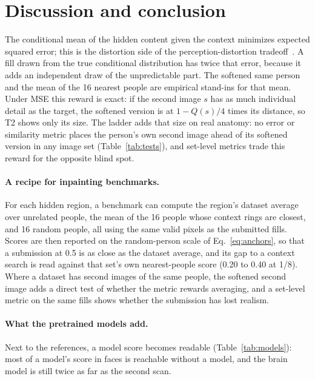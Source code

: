 \section{Discussion and conclusion}
\label{sec:synthesis}
The conditional mean of the hidden content given the context minimizes expected squared error; this is the distortion side of the perception-distortion tradeoff~\cite{blau2018}.
A fill drawn from the true conditional distribution has twice that error, because it adds an independent draw of the unpredictable part.
The softened same person and the mean of the 16 nearest people are empirical stand-ins for that mean.
Under \ac{MSE} this reward is exact: if the second image $s$ has as much individual detail as the target, the softened version is at $1-Q(s)/4$ times its distance, so T2 shows only its size.
The ladder adds that size on real anatomy: no error or similarity metric places the person's own second image ahead of its softened version in any image set (Table~\ref{tab:tests}), and set-level metrics trade this reward for the opposite blind spot.

\paragraph{A recipe for inpainting benchmarks.}
For each hidden region, a benchmark can compute the region's dataset average over unrelated people, the mean of the 16 people whose context rings are closest, and 16 random people, all using the same valid pixels as the submitted fills.
Scores are then reported on the random-person scale of Eq.~\ref{eq:anchors}, so that a submission at 0.5 is as close as the dataset average, and its gap to a context search is read against that set's own nearest-people score (0.20 to 0.40 at 1/8).
Where a dataset has second images of the same people, the softened second image adds a direct test of whether the metric rewards averaging, and a set-level metric on the same fills shows whether the submission has lost realism.

\paragraph{What the pretrained models add.}
Next to the references, a model score becomes readable (Table~\ref{tab:models}): most of a model's score in faces is reachable without a model, and the brain model is still twice as far as the second scan.

